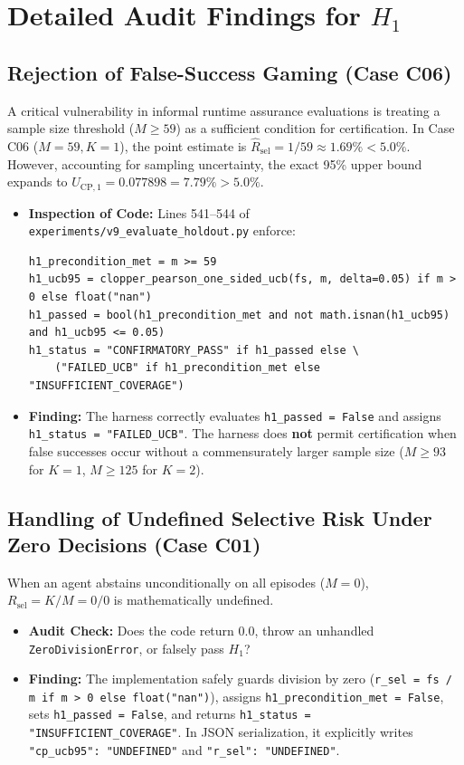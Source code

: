 \documentclass[10pt,a4paper]{article}
\begin{document}
\section{Detailed Audit Findings for $H_1$}

\subsection{Rejection of False-Success Gaming (Case C06)}
A critical vulnerability in informal runtime assurance evaluations is treating a sample size threshold ($M \ge 59$) as a sufficient condition for certification. In Case C06 ($M = 59, K = 1$), the point estimate is $\hat{R}_{\mathrm{sel}} = 1/59 \approx 1.69\% < 5.0\%$. However, accounting for sampling uncertainty, the exact 95\% upper bound expands to $U_{\mathrm{CP}, 1} = 0.077898 = 7.79\% > 5.0\%$.
\begin{itemize}
    \item \textbf{Inspection of Code:} Lines 541--544 of \texttt{experiments/v9\_evaluate\_holdout.py} enforce:
\begin{verbatim}
h1_precondition_met = m >= 59
h1_ucb95 = clopper_pearson_one_sided_ucb(fs, m, delta=0.05) if m > 0 else float("nan")
h1_passed = bool(h1_precondition_met and not math.isnan(h1_ucb95) and h1_ucb95 <= 0.05)
h1_status = "CONFIRMATORY_PASS" if h1_passed else \
    ("FAILED_UCB" if h1_precondition_met else "INSUFFICIENT_COVERAGE")
\end{verbatim}
    \item \textbf{Finding:} The harness correctly evaluates \texttt{h1\_passed = False} and assigns \texttt{h1\_status = "FAILED\_UCB"}. The harness does \textbf{not} permit certification when false successes occur without a commensurately larger sample size ($M \ge 93$ for $K=1$, $M \ge 125$ for $K=2$).
\end{itemize}

\subsection{Handling of Undefined Selective Risk Under Zero Decisions (Case C01)}
When an agent abstains unconditionally on all episodes ($M = 0$), $R_{\mathrm{sel}} = K / M = 0 / 0$ is mathematically undefined.
\begin{itemize}
    \item \textbf{Audit Check:} Does the code return $0.0$, throw an unhandled \texttt{ZeroDivisionError}, or falsely pass $H_1$?
    \item \textbf{Finding:} The implementation safely guards division by zero (\texttt{r\_sel = fs / m if m > 0 else float("nan")}), assigns \texttt{h1\_precondition\_met = False}, sets \texttt{h1\_passed = False}, and returns \texttt{h1\_status = "INSUFFICIENT\_COVERAGE"}. In JSON serialization, it explicitly writes \texttt{"cp\_ucb95": "UNDEFINED"} and \texttt{"r\_sel": "UNDEFINED"}.
\end{itemize}
\end{document}
